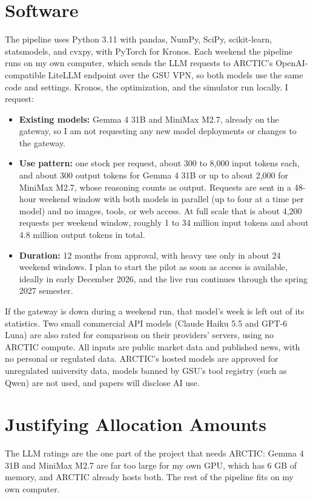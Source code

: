 \documentclass[11pt,letterpaper]{article}
\begin{document}
\section{Software}
The pipeline uses Python 3.11 with pandas, NumPy, SciPy, scikit-learn, statsmodels, and cvxpy, with PyTorch for Kronos. Each weekend the pipeline runs on my own computer, which sends the LLM requests to ARCTIC's OpenAI-compatible LiteLLM endpoint over the GSU VPN, so both models use the same code and settings. Kronos, the optimization, and the simulator run locally. I request:
\begin{itemize}
\item \textbf{Existing models:} Gemma 4 31B and MiniMax M2.7, already on the gateway, so I am not requesting any new model deployments or changes to the gateway.
\item \textbf{Use pattern:} one stock per request, about 300 to 8,000 input tokens each, and about 300 output tokens for Gemma 4 31B or up to about 2,000 for MiniMax M2.7, whose reasoning counts as output. Requests are sent in a 48-hour weekend window with both models in parallel (up to four at a time per model) and no images, tools, or web access. At full scale that is about 4,200 requests per weekend window, roughly 1 to 34 million input tokens and about 4.8 million output tokens in total.
\item \textbf{Duration:} 12 months from approval, with heavy use only in about 24 weekend windows. I plan to start the pilot as soon as access is available, ideally in early December 2026, and the live run continues through the spring 2027 semester.
\end{itemize}
If the gateway is down during a weekend run, that model's week is left out of its statistics. Two small commercial API models (Claude Haiku 5.5 and GPT-6 Luna) are also rated for comparison on their providers' servers, using no ARCTIC compute. All inputs are public market data and published news, with no personal or regulated data. ARCTIC's hosted models are approved for unregulated university data, models banned by GSU's tool registry (such as Qwen) are not used, and papers will disclose AI use.

\section{Justifying Allocation Amounts}
The LLM ratings are the one part of the project that needs ARCTIC: Gemma 4 31B and MiniMax M2.7 are far too large for my own GPU, which has 6 GB of memory, and ARCTIC already hosts both. The rest of the pipeline fits on my own computer.
\end{document}
